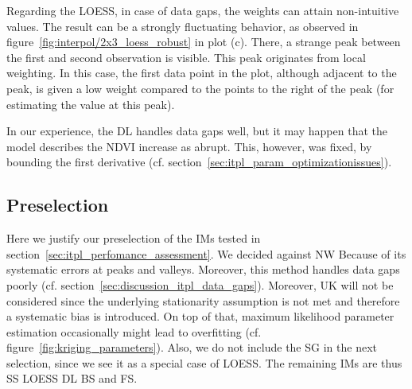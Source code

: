 {{        Regarding the LOESS, in case of data gaps, the weights can attain non-intuitive values. The result can be a strongly fluctuating behavior, as observed in figure~\ref{fig:interpol/2x3_loess_robust} in plot (c). There, a strange peak between the first and second observation is visible. This peak originates from local weighting. In this case, the first data point in the plot, although adjacent to the peak, is given a low weight compared to the points to the right of the peak (for estimating the value at this peak).

        In our experience, the DL handles data gaps well, but it may happen that the model describes the NDVI increase as abrupt. This, however, was fixed, by bounding the first derivative (cf. section~\ref{sec:itpl_param_optimizationissues}).
    }

    \subsection{Preselection}{\label{sec:itpl_preselection}
        Here we justify our preselection of the {{IM}}s tested in section~\ref{sec:itpl_perfomance_assessment}. 
        We decided against NW Because of its systematic errors at peaks and valleys. Moreover, this method handles data gaps poorly (cf. section~\ref{sec:discussion_itpl_data_gaps}). 
        Moreover, UK will not be considered since the underlying stationarity assumption is not met and therefore a systematic bias is introduced. On top of that, maximum likelihood parameter estimation occasionally might lead to overfitting (cf. figure~\ref{fig:kriging_parameters}).
        Also, we do not include the SG in the next selection, since we see it as a special case of LOESS.
        The remaining IMs are thus SS LOESS DL BS and FS.
    }

}
